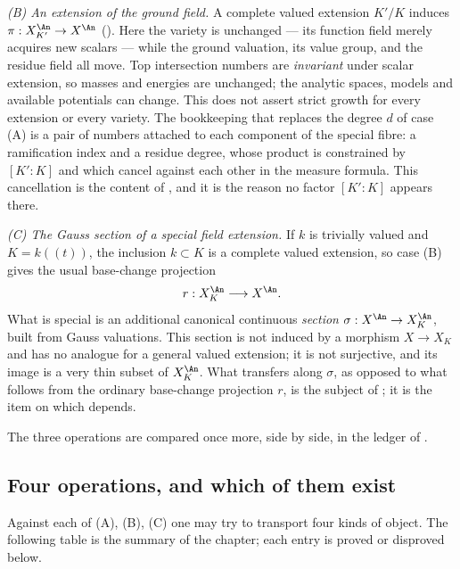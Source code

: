 \emph{(B) An extension of the ground field.}  A complete valued extension
$K'/K$ induces $\pi:X_{K'}^{\An}\to X^{\An}$
().  Here the variety is unchanged --- its
function field merely acquires new scalars --- while the ground valuation,
its value group, and the residue field all move.  Top intersection numbers
are \emph{invariant} under scalar extension, so masses and energies are
unchanged; the analytic spaces, models and available potentials can change.  This
does not assert strict growth for every extension or every variety.  The bookkeeping that replaces the degree
$d$ of case (A) is a pair of numbers attached to each component of the
special fibre: a ramification index and a residue degree, whose product is
constrained by $[K':K]$ and which cancel against each other in the measure
formula.  This cancellation is the content of
, and it is the reason no factor $[K':K]$ appears
there.

\emph{(C) The Gauss section of a special field extension.}  If $k$ is
trivially valued and $K=k(\!(t)\!)$, the inclusion $k\subset K$ is a
complete valued extension, so case (B) gives the usual base-change
projection
\[
                   r:X_K^{\An}\longrightarrow X^{\An}.
\]
What is special is an additional canonical continuous \emph{section}
$\sigma:X^{\An}\to X_K^{\An}$, built from Gauss valuations.  This section
is not induced by a morphism $X\to X_K$ and has no analogue for a general
valued extension; it is not surjective, and its image is a very thin subset
of $X_K^{\An}$.  What transfers along $\sigma$, as opposed to what follows
from the ordinary base-change projection $r$, is the subject of
; it is the item on which  depends.

The three operations are compared once more, side by side, in the ledger of
.

\subsection{Four operations, and which of them exist}
\label{sec:ch30-four-operations}

Against each of (A), (B), (C) one may try to transport four kinds of object.
The following table is the summary of the chapter; each entry is proved or
disproved below.

